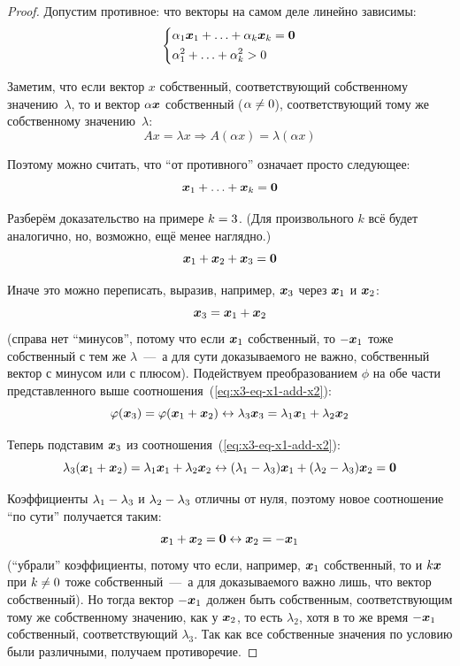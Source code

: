 \documentclass[a4paper,12pt]{article}
\begin{document}
  \begin{proof}
    Допустим противное: что векторы на самом деле линейно зависимы:
    \[
      \left\{
        \begin{aligned}
          &\alpha_1 \boldsymbol x_1 + \ldots + \alpha_k \boldsymbol x_k = \boldsymbol 0\\
          &\alpha_1^2 + \ldots + \alpha_k^2 > 0
        \end{aligned}
      \right.
    \]
    
    Заметим, что если вектор $x$ собственный, соответствующий собственному значению~$\lambda$, то и вектор $\alpha \boldsymbol x$ собственный ($\alpha \hm{\not=} 0$), соответствующий тому же собственному значению~$\lambda$:
    \[
      Ax = \lambda x \Rightarrow A (\alpha x) = \lambda (\alpha x)
    \]
    
    Поэтому можно считать, что ``от противного'' означает просто следующее:
    \[
      \boldsymbol x_1 + \ldots + \boldsymbol x_k = \boldsymbol 0
    \]
    
    Разберём доказательство на примере $k \hm= 3$.
    (Для произвольного $k$ всё будет аналогично, но, возможно, ещё менее наглядно.)
    \[
      \boldsymbol x_1 + \boldsymbol x_2 + \boldsymbol x_3 = \boldsymbol 0
    \]
    
    Иначе это можно переписать, выразив, например, $\boldsymbol x_3$ через $\boldsymbol x_1$ и $\boldsymbol x_2$:
    \begin{equation}\label{eq:x3-eq-x1-add-x2}
      \boldsymbol x_3 = \boldsymbol x_1 + \boldsymbol x_2
    \end{equation}
    (справа нет ``минусов'', потому что если $\boldsymbol x_1$ собственный, то $-{\boldsymbol x_1}$ тоже собственный с тем же $\lambda$~---~а для сути доказываемого не важно, собственный вектор с минусом или с плюсом).
    Подействуем преобразованием $\phi$ на обе части представленного выше соотношения~(\ref{eq:x3-eq-x1-add-x2}):
    \[
      \varphi(\boldsymbol x_3) = \varphi(\boldsymbol x_1 + \boldsymbol x_2) \leftrightarrow \lambda_3 \boldsymbol x_3 = \lambda_1 \boldsymbol x_1 + \lambda_2 \boldsymbol x_2
    \]
    
    Теперь подставим $\boldsymbol x_3$ из соотношения~(\ref{eq:x3-eq-x1-add-x2}):
    \[
      \lambda_3 (\boldsymbol x_1 + \boldsymbol x_2) = \lambda_1 \boldsymbol x_1 + \lambda_2 \boldsymbol x_2
      \leftrightarrow (\lambda_1 - \lambda_3) \boldsymbol x_1 + (\lambda_2 - \lambda_3) \boldsymbol x_2 = \boldsymbol 0
    \]
    
    Коэффициенты $\lambda_1 \hm- \lambda_3$ и $\lambda_2 \hm- \lambda_3$ отличны от нуля, поэтому новое соотношение ``по сути'' получается таким:
    \[
      \boldsymbol x_1 + \boldsymbol x_2 = \boldsymbol 0 \leftrightarrow \boldsymbol x_2 = -{\boldsymbol x_1}
    \]
    (``убрали'' коэффициенты, потому что если, например, $\boldsymbol x_1$ собственный, то и  $k \boldsymbol x$ при $k \hm{\not=} 0$ тоже собственный~---~а для доказываемого важно лишь, что вектор собственный).
    Но тогда вектор $-{\boldsymbol x_1}$ должен быть собственным, соответствующим тому же собственному значению, как у $\boldsymbol x_2$, то есть $\lambda_2$, хотя в то же время $-{\boldsymbol x_1}$ собственный, соответствующий $\lambda_3$.
    Так как все собственные значения по условию были различными, получаем противоречие.
    

\end{proof}
\end{document}
